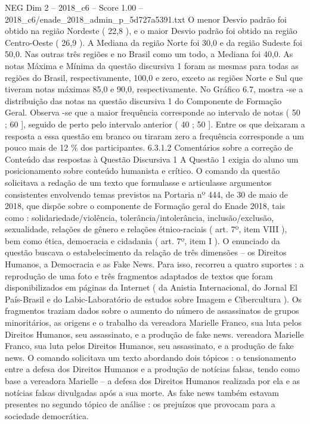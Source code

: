 \begin{textsample}{NEG Dim 2 – 2018\_c6 – Score 1.00 – 2018\_c6/enade\_2018\_admin\_p\_5d727a5391.txt}
O menor Desvio padrão foi obtido na região Nordeste ( 22,8 ), e o maior Desvio padrão foi obtido na região Centro-Oeste ( 26,9 ).
A Mediana da região Norte foi 30,0 e da região Sudeste foi 50,0.
Nas outras três regiões e no Brasil como um todo, a Mediana foi 40,0.
As notas Máxima e Mínima da questão discursiva 1 foram as mesmas para todas as regiões do Brasil, respectivamente, 100,0 e zero, exceto as regiões Norte e Sul que tiveram notas máximas 85,0 e 90,0, respectivamente.
No Gráfico 6.7, mostra -se a distribuição das notas na questão discursiva 1 do Componente de Formação Geral.
Observa -se que a maior frequência corresponde ao intervalo de notas ( 50 ; 60 ], seguido de perto pelo intervalo anterior ( 40 ; 50 ].
Entre os que deixaram a resposta a essa questão em branco ou tiraram zero a frequência corresponde a um pouco mais de 12 \% dos participantes. 6.3.1.2 Comentários sobre a correção de Conteúdo das respostas à Questão Discursiva 1 A Questão 1 exigia do aluno um posicionamento sobre conteúdo humanista e crítico.
O comando da questão solicitava a redação de um texto que formulasse e articulasse argumentos consistentes envolvendo temas previstos na Portaria nº 444, de 30 de maio de 2018, que dispõe sobre o componente de Formação geral do Enade 2018, tais como : solidariedade/violência, tolerância/intolerância, inclusão/exclusão, sexualidade, relações de gênero e relações étnico-raciais ( art. 7º, item VIII ), bem como ética, democracia e cidadania ( art. 7º, item I ).
O enunciado da questão buscava o estabelecimento da relação de três dimensões – os Direitos Humanos, a Democracia e as Fake News.
Para isso, recorreu a quatro suportes : a reprodução de uma foto e três fragmentos adaptados de textos que foram disponibilizados em páginas da Internet ( da Anistia Internacional, do Jornal El País-Brasil e do Labic-Laboratório de estudos sobre Imagem e Cibercultura ).
Os fragmentos traziam dados sobre o aumento do número de assassinatos de grupos minoritários, as origens e o trabalho da vereadora Marielle Franco, sua luta pelos Direitos Humanos, seu assassinato, e a produção de fake news. vereadora Marielle Franco, sua luta pelos Direitos Humanos, seu assassinato, e a produção de fake news.
O comando solicitava um texto abordando dois tópicos : o tensionamento entre a defesa dos Direitos Humanos e a produção de notícias falsas, tendo como base a vereadora Marielle – a defesa dos Direitos Humanos realizada por ela e as notícias falsas divulgadas após a sua morte.
As fake news também estavam presentes no segundo tópico de análise : os prejuízos que provocam para a sociedade democrática.

\end{textsample}

